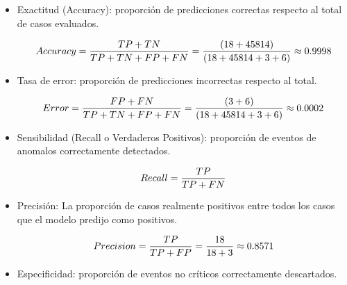 \begin{itemize}
      \item  Exactitud (Accuracy): proporción de predicciones correctas respecto al total de casos evaluados.

            \begin{align}
                  Accuracy = \frac{TP+TN}{TP+TN+FP+FN}=\frac{(18+45814)}{(18+45814+3+6)}\approx 0.9998 \notag \\
                  \label{eq:accuracy}
            \end{align}


      \item Tasa de error: proporción de predicciones incorrectas respecto al total.

            \begin{align}
                  Error = \frac{FP+FN}{TP+TN+FP+FN}=\frac{(3+6)}{(18+45814+3+6)}\approx 0.0002 \notag \\
                  \label{eq:error}
            \end{align}

      \item Sensibilidad (Recall o Verdaderos Positivos): proporción de eventos de anomalos correctamente detectados.

            \begin{align}
                  Recall = \frac{TP}{TP+FN} \notag \\
                  \label{eq:recall}
            \end{align}

      \item Precisión: La proporción de casos realmente positivos entre todos los casos que el modelo predijo como positivos.

            \begin{align}
                  Precision = \frac{TP}{TP+FP}=\frac{18}{18+3}\approx 0.8571 \notag \\
                  \label{eq:precision}
            \end{align}

      \item Especificidad: proporción de eventos no críticos correctamente descartados.


\end{itemize}
